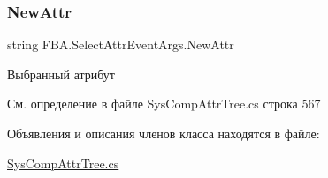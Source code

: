 \subsubsection{\texorpdfstring{New\+Attr}{NewAttr}}
{\footnotesize\ttfamily string F\+B\+A.\+Select\+Attr\+Event\+Args.\+New\+Attr\hspace{0.3cm}{\ttfamily [get]}}



Выбранный атрибут 



См. определение в файле Sys\+Comp\+Attr\+Tree.\+cs строка 567



Объявления и описания членов класса находятся в файле\+:\begin{DoxyCompactItemize}
\item 
\mbox{\hyperlink{_sys_comp_attr_tree_8cs}{Sys\+Comp\+Attr\+Tree.\+cs}}\end{DoxyCompactItemize}
